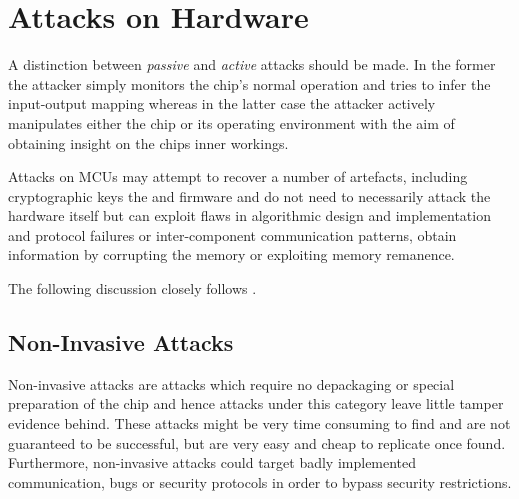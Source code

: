 \section{Attacks on Hardware}
\label{sec:curr_attacks}
A distinction between \emph{passive} and \emph{active} attacks should be made. In the former the attacker simply monitors the chip's normal operation and tries to infer the input-output mapping whereas in the latter case the attacker actively manipulates either the chip or its operating environment with the aim of obtaining insight on the chips inner workings. 

Attacks on MCUs may attempt to recover a number of artefacts, including cryptographic keys the and firmware and do not need to necessarily attack the hardware itself but can exploit flaws in algorithmic design and implementation and protocol failures or inter-component communication patterns\citep{anderson:cautionary_note}\citep{kocher:DPA}, obtain information by corrupting the memory or exploiting memory remanence\citep{sergei:thesis}\citep{gutman:memory_remanence}.

The following discussion closely follows \citep{sergei:thesis}.

	\subsection{Non-Invasive Attacks}
	Non-invasive attacks are attacks which require no depackaging or special preparation of the chip and hence attacks under this category leave little tamper evidence behind. These attacks might be very time consuming to find and are not guaranteed to be successful, but are very easy and cheap to replicate once found. Furthermore, non-invasive attacks could target badly implemented communication, bugs or security protocols in order to bypass security restrictions.
	
